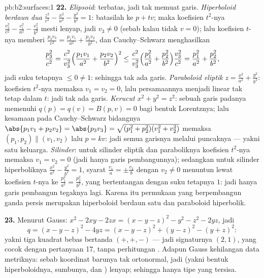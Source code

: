 \begin{solution}{pb:b2:surfaces:1}
\textbf{22.} \emph{Elipsoid}: terbatas, jadi tak memuat garis.
\emph{Hiperboloid berdaun dua} $\frac{z^2}{c^2} -
\frac{x^2}{a^2} - \frac{y^2}{b^2} = 1$: batasilah ke $p + tv$;
maka koefisien $t^2$-nya $\frac{v_3^2}{c^2} - \frac{v_1^2}{a^2}
- \frac{v_2^2}{b^2}$ mesti lenyap, jadi $v_3 \neq 0$ (sebab kalau tidak $v =
0$); lalu koefisien $t$-nya memberi $\frac{p_3v_3}{c^2} =
\frac{p_1v_1}{a^2} + \frac{p_2v_2}{b^2}$, dan Cauchy--Schwarz
menghasilkan
\[
\frac{p_3^2}{c^2}
= \frac{c^2}{v_3^2}\Bigl(\frac{p_1v_1}{a^2} +
\frac{p_2v_2}{b^2}\Bigr)^2
\leq \frac{c^2}{v_3^2}\Bigl(\frac{p_1^2}{a^2} +
\frac{p_2^2}{b^2}\Bigr)\frac{v_3^2}{c^2}
= \frac{p_1^2}{a^2} + \frac{p_2^2}{b^2},
\]
jadi suku tetapnya $\leq 0 \neq 1$: sehingga tak ada garis.
\emph{Paraboloid eliptik} $z = \frac{x^2}{a^2} +
\frac{y^2}{b^2}$: koefisien $t^2$-nya memaksa $v_1 = v_2 =
0$, lalu persamaannya menjadi linear tak tetap dalam $t$: jadi tak ada garis.
\emph{Kerucut} $x^2 + y^2 = z^2$: sebuah garis padanya memenuhi $q(p) =
q(v) = B(p, v) = 0$ bagi bentuk Lorentznya; lalu kesamaan pada
Cauchy--Schwarz bidangnya $\abs{p_1v_1 + p_2v_2} = \abs{p_3v_3} =
\sqrt{(p_1^2 + p_2^2)(v_1^2 + v_2^2)}$ memaksa $(p_1, p_2)
\parallel (v_1, v_2)$ lalu $p = kv$: jadi semua garisnya melalui
puncaknya --- yakni satu keluarga. \emph{Silinder}: untuk
silinder eliptik dan paraboliknya koefisien $t^2$-nya memaksa
$v_1 = v_2 = 0$ (jadi hanya garis pembangunnya); sedangkan untuk silinder hiperboliknya
$\frac{x^2}{a^2} - \frac{y^2}{b^2} = 1$, syarat $\frac{v_1}a = \pm
\frac{v_2}b$ dengan $v_2 \neq 0$ menuntun lewat koefisien $t$-nya
ke $\frac{p_1^2}{a^2} = \frac{p_2^2}{b^2}$, yang bertentangan dengan
suku tetapnya $1$: jadi hanya garis pembangun tegaknya lagi. Karena itu
permukaan  yang berpembangun ganda persis merupakan hiperboloid
berdaun satu dan paraboloid hiperbolik.

\textbf{23.} Menurut Gauss: $x^2 - 2xy - 2zx = (x - y - z)^2 - y^2 -
z^2 - 2yz$, jadi
\[
q = (x - y - z)^2 - 4yz = (x - y - z)^2 + (y - z)^2 - (y +
z)^2 :
\]
yakni tiga kuadrat bebas bertanda $(+, +, -)$ --- jadi signaturnya
$(2, 1)$, yang cocok dengan pertanyaan 17, tanpa perhitungan . Adapun Gauss kehilangan data metriknya: sebab koordinat barunya
tak ortonormal, jadi  (yakni bentuk hiperboloidnya,
sumbunya, dan ) lenyap; sehingga hanya tipe  yang tersisa.


\end{solution}
